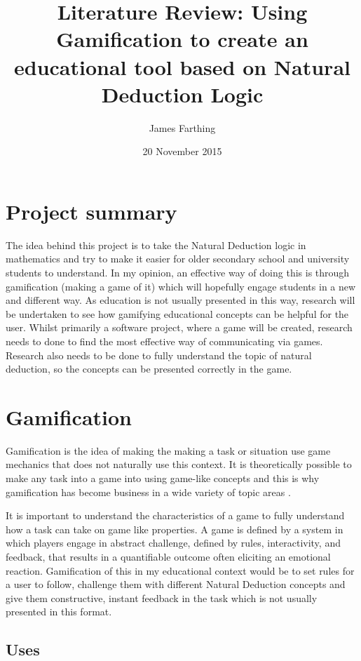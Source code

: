 \documentclass[a4paper]{article}
\title{Literature Review: Using Gamification to create an educational tool based on Natural Deduction Logic }
\author{James Farthing}
\date{20 November 2015}
\begin{document}
\maketitle
\newpage
\tableofcontents
\newpage
\section{Project summary}

The idea behind this project is to take the Natural Deduction logic in mathematics and try to make it easier for older secondary school and university students to understand. In my opinion, an effective way of doing this is through gamification (making a game of it) which will hopefully engage students in a new and different way. As education is not usually presented in this way, research will be undertaken to see how gamifying educational concepts can be helpful for the user. Whilst primarily a software project, where a game will be created, research needs to done to find the most effective way of communicating via games. Research also needs to be done to fully understand the topic of natural deduction, so the concepts can be presented correctly in the game.

\section{Gamification}

Gamification is the idea of making the making a task or situation use game mechanics that does not naturally use this context. It is theoretically possible to make any task into a game into using game-like concepts and this is why gamification has become business in a wide variety of topic areas \cite{muntean2011raising}.

It is important to understand the characteristics of a game to fully understand how a task can take on game like properties. A game is defined by a system in which players engage in abstract challenge, defined by rules, interactivity, and feedback, that results in a quantifiable outcome often eliciting an emotional reaction. \cite{koster2013theory} Gamification of this in my educational context would be to set rules for a user to follow, challenge them with different Natural Deduction concepts and give them constructive, instant feedback in the task which is not usually presented in this format.

\subsection{Uses}
\end{document}
